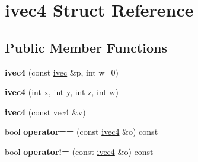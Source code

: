 \hypertarget{structivec4}{}\section{ivec4 Struct Reference}
\label{structivec4}
\subsection*{Public Member Functions}
\begin{DoxyCompactItemize}
\item 
\mbox{\label{structivec4_a55bce64a60d89d396de6186446598d0d}} 
{\bfseries ivec4} (const \hyperlink{structivec}{ivec} \&p, int w=0)
\item 
\mbox{\label{structivec4_aa0fb1ac14faa9a727cd1455b7f86e3b2}} 
{\bfseries ivec4} (int x, int y, int z, int w)
\item 
\mbox{\label{structivec4_ad96066141a205897cfb9a3c68978e45b}} 
{\bfseries ivec4} (const \hyperlink{structvec4}{vec4} \&v)
\item 
\mbox{\label{structivec4_a9001ea9b1d738a1bd770a232dbe8b021}} 
bool {\bfseries operator==} (const \hyperlink{structivec4}{ivec4} \&o) const
\item 
\mbox{\label{structivec4_a6157386ec8c9a634861a07a16fdfa7ca}} 
bool {\bfseries operator!=} (const \hyperlink{structivec4}{ivec4} \&o) const
\end{DoxyCompactItemize}
